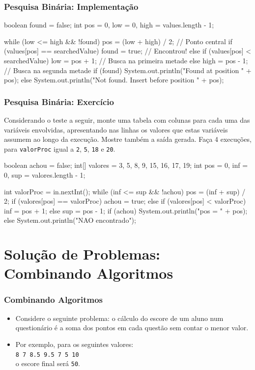 \documentclass[xcolor={dvipsnames,table},aspectratio=169]{beamer}
\begin{document}
\begin{frame}[fragile]\frametitle{Pesquisa Binária: Implementação}
{\scriptsize
\begin{javacode}
boolean found = false;
int pos = 0, low = 0, high = values.length - 1;

while (low <= high && !found) {
   pos = (low + high) / 2; // Ponto central
   if (values[pos] == searchedValue)
      found = true;        // Encontrou!
   else if (values[pos] < searchedValue) 
      low = pos + 1;       // Busca na primeira metade
   else
      high = pos - 1;      // Busca na segunda metade
}
if (found)
   System.out.println("Found at position " + pos);
else 
   System.out.println("Not found. Insert before position " + pos);
\end{javacode}
}
\end{frame}

\begin{frame}[fragile]\frametitle{Pesquisa Binária: Exercício}
{\scriptsize
Considerando o teste a seguir, monte uma tabela com colunas para cada uma das variáveis envolvidas, apresentando nas linhas os valores que estas variáveis assumem ao longo da execução. Mostre também a saída gerada. Faça 4 execuções, para \texttt{valorProc} igual a \texttt{2}, \texttt{5}, \texttt{18} e \texttt{20}.}\\
{\tiny
\begin{javacode}
boolean achou = false;
int[] valores = { 3, 5, 8, 9, 15, 16, 17, 19};
int pos = 0, inf = 0, sup = valores.length - 1;

int valorProc = in.nextInt();
while (inf <= sup && !achou) {
   pos = (inf + sup) / 2;
   if (valores[pos] == valorProc)
      achou = true;
   else if (valores[pos] < valorProc) 
      inf = pos + 1;
   else
      sup = pos - 1;
}
if (achou)
   System.out.println("pos = " + pos);
else 
   System.out.println("NAO encontrado");
\end{javacode}
}
\end{frame}

\section{Solução de Problemas: Combinando Algoritmos}

\begin{frame}\frametitle{Combinando Algoritmos}
\begin{itemize}
	\item Considere o seguinte problema: o cálculo do escore de um aluno num questionário é a soma dos pontos em cada questão sem contar o menor valor.
	\item Por exemplo, para os seguintes valores:\\ \texttt{8    7    8.5    9.5    7     5    10}\\o escore final será \texttt{50}.
\end{itemize}
\end{frame}
\end{document}
